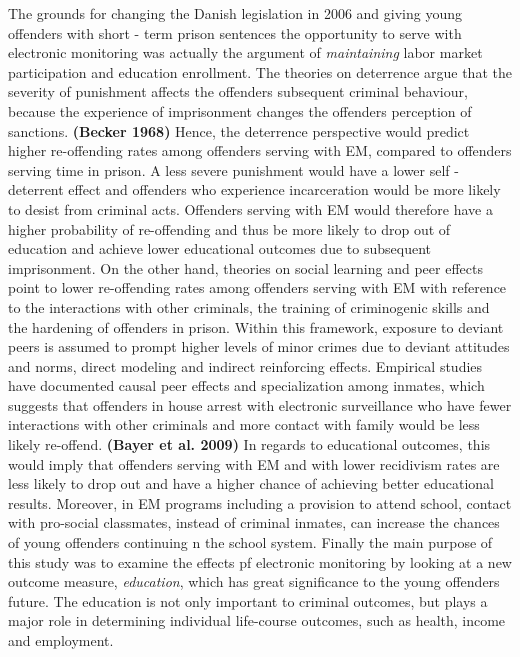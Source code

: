 \documentclass[a4paper,12pt]{article}
\begin{document}
The grounds for changing the Danish legislation in 2006 and giving young offenders with short - term prison sentences the opportunity to serve with electronic monitoring was actually the argument of \textit{maintaining} labor market participation and education enrollment. The theories on deterrence argue that the severity of punishment affects the offenders subsequent criminal behaviour, because the experience of imprisonment changes the offenders perception of sanctions. \textbf{(Becker 1968)} \cite{Becker1968} Hence, the deterrence perspective would predict higher re-offending rates among offenders serving with EM, compared to offenders serving time in prison. A less severe punishment would have a lower self - deterrent effect and offenders who experience incarceration would be more likely to desist from criminal acts. Offenders serving with EM would therefore have a higher probability of re-offending and thus be more likely to drop out of education and achieve lower educational outcomes due to subsequent imprisonment. On the other hand, theories on social learning and peer effects point to lower re-offending rates among offenders serving with EM with reference to the interactions with other criminals, the training of criminogenic skills and the hardening of offenders in prison. Within this framework, exposure to deviant peers is assumed to prompt higher levels of minor crimes due to deviant attitudes and norms, direct modeling and indirect reinforcing effects. Empirical studies have documented causal peer effects and specialization among inmates, which suggests that offenders in house arrest with electronic surveillance who have fewer interactions with other criminals and more contact with family would be less likely re-offend. \textbf{(Bayer et al. 2009)} \cite{bayer2009can} In regards to educational outcomes, this would imply that offenders serving with EM and with lower recidivism rates  are less likely to drop out and have a higher chance of achieving better educational results. Moreover, in EM programs including a provision to attend school, contact with pro-social classmates, instead of criminal inmates, can increase the chances of young offenders continuing n the school system. Finally the main purpose of this study was to examine the effects pf electronic monitoring by looking at a new outcome measure, \textit{education}, which has great significance to the young offenders future. The education is not only important to criminal outcomes, but plays a major role in determining individual life-course outcomes, such as health, income and employment. 
\end{document}
